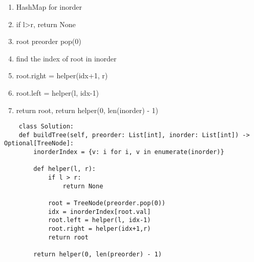 \documentclass{assignmeownt}
\begin{document}
\begin{enumerate}
    \item HashMap for inorder
    \item if l>r, return None
    \item root preorder pop(0)
    \item find the index of root in inorder
    \item root.right = helper(idx+1, r)
    \item root.left = helper(l, idx-1)
    \item return root, return helper(0, len(inorder) - 1)
\end{enumerate}
\begin{lstlisting}
    class Solution:
    def buildTree(self, preorder: List[int], inorder: List[int]) -> Optional[TreeNode]:
        inorderIndex = {v: i for i, v in enumerate(inorder)}

        def helper(l, r):
            if l > r:
                return None
            
            root = TreeNode(preorder.pop(0))
            idx = inorderIndex[root.val]
            root.left = helper(l, idx-1)
            root.right = helper(idx+1,r)
            return root
        
        return helper(0, len(preorder) - 1)
        
\end{lstlisting}











\end{document}
